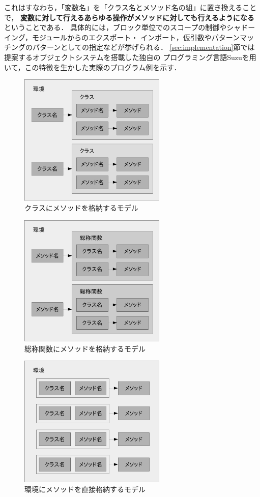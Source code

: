\documentclass{ipsjprosym}
\begin{document}
これはすなわち，「変数名」を「クラス名とメソッド名の組」に置き換えることで，
\textbf{変数に対して行えるあらゆる操作がメソッドに対しても行えるようになる}ということである．
具体的には，ブロック単位でのスコープの制御やシャドーイング，モジュールからのエクスポート・
インポート，仮引数やパターンマッチングのパターンとしての指定などが挙げられる．
\ref{sec:implementation}節では提案するオブジェクトシステムを搭載した独自の
プログラミング言語Suzuを用いて，この特徴を生かした実際のプログラム例を示す．

\begin{figure}
\centering
\includegraphics[width=7cm]{fig/classes-crop.pdf}
\caption{クラスにメソッドを格納するモデル}
\label{fig:classes}
\end{figure}

\begin{figure}
\centering
\includegraphics[width=7cm]{fig/generic-functions-crop.pdf}
\caption{総称関数にメソッドを格納するモデル}
\label{fig:generic-functions}
\end{figure}

\begin{figure}
\centering
\includegraphics[width=7cm]{fig/environment-crop.pdf}
\caption{環境にメソッドを直接格納するモデル}
\label{fig:environment}
\end{figure}
\end{document}
